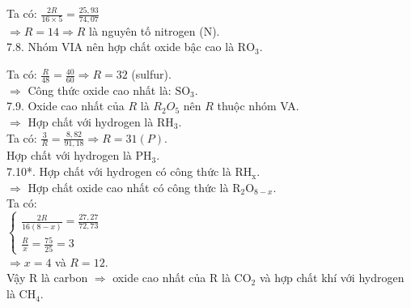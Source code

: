 \documentclass[10pt]{article}
\begin{document}
Ta có: $\frac{2 R}{16 \times 5}=\frac{25,93}{74,07}$\\
$\Rightarrow R=14 \Rightarrow R$ là nguyên tố nitrogen (N).\\
7.8. Nhóm VIA nên hợp chất oxide bậc cao là $\mathrm{RO}_{3}$.

Ta có: $\frac{R}{48}=\frac{40}{60} \Rightarrow R=32$ (sulfur).\\
$\Rightarrow$ Công thức oxide cao nhất là: $\mathrm{SO}_{3}$.\\
7.9. Oxide cao nhất của $R$ là $R_{2} O_{5}$ nên $R$ thuộc nhóm VA.\\
$\Rightarrow$ Hợp chất với hydrogen là $\mathrm{RH}_{3}$.\\
Ta có: $\frac{3}{R}=\frac{8,82}{91,18} \Rightarrow R=31(P)$.\\
Hợp chất với hydrogen là $\mathrm{PH}_{3}$.\\
7.10*. Hợp chất với hydrogen có công thức là $\mathrm{RH}_{\mathrm{x}}$.\\
$\Rightarrow$ Hợp chất oxide cao nhất có công thức là $\mathrm{R}_{2} \mathrm{O}_{8-x}$.\\
Ta có:\\
$\left\{\begin{array}{l}\frac{2 R}{16(8-x)}=\frac{27,27}{72,73} \\ \frac{R}{x}=\frac{75}{25}=3\end{array}\right.$\\
$\Rightarrow x=4$ và $R=12$.\\
Vậy R là carbon $\Rightarrow$ oxide cao nhất của R là $\mathrm{CO}_{2}$ và hợp chất khí với hydrogen là $\mathrm{CH}_{4}$.
\end{document}
